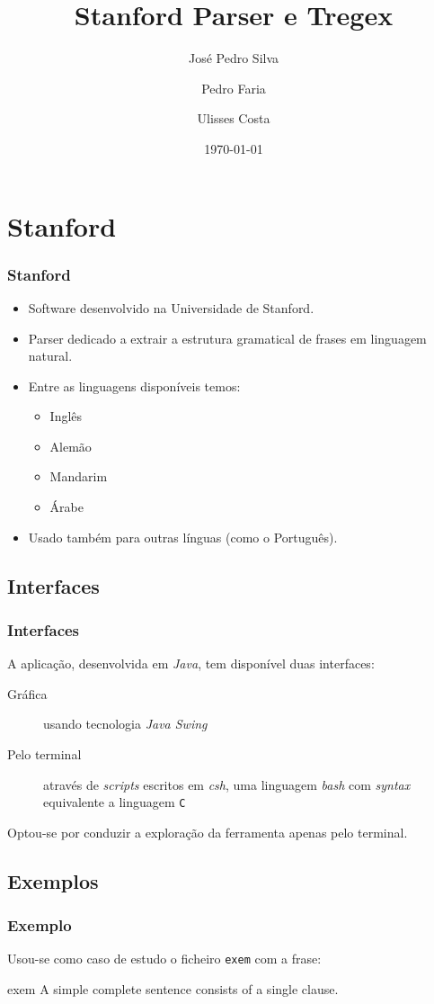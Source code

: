 \documentclass{beamer}
\title{Stanford Parser e Tregex}
\author{José Pedro Silva \and
Pedro Faria \and
Ulisses Costa
}
\date{\today}
\institute{Engenharia de Linguagens\\
Processamento de Linguagem Natural
}
\begin{document}
\begin{frame}
   \titlepage
\end{frame}

\section{Stanford}
\begin{frame} \frametitle{Stanford}
\begin{itemize}
 \item Software desenvolvido na Universidade de Stanford.
 \item Parser dedicado a extrair a estrutura gramatical de frases em linguagem natural.
 \item Entre as linguagens disponíveis temos: \begin{itemize}
                                               \item Inglês
					       \item Alemão
					       \item Mandarim
					       \item Árabe
                                              \end{itemize}
 \item Usado também para outras línguas (como o Português).
\end{itemize}

\end{frame}

\subsection{Interfaces}
\begin{frame} \frametitle{Interfaces}
 A aplicação, desenvolvida em \emph{Java}, tem disponível duas interfaces:
\begin{description}
 \item [Gráfica] usando tecnologia \emph{Java Swing}
 \item [Pelo terminal] através de \emph{scripts} escritos em \emph{csh}, uma linguagem \emph{bash} com \emph{syntax} equivalente a linguagem \texttt{C}
\end{description}
Optou-se por conduzir a exploração da ferramenta apenas pelo terminal.
\end{frame}

\subsection{Exemplos}
\begin{frame} \frametitle{Exemplo}
 Usou-se como caso de estudo o ficheiro \texttt{exem} com a frase:
 
\begin{block}{exem}
A simple complete sentence consists of a single clause.
\end{block}

\end{frame}
\end{document}
